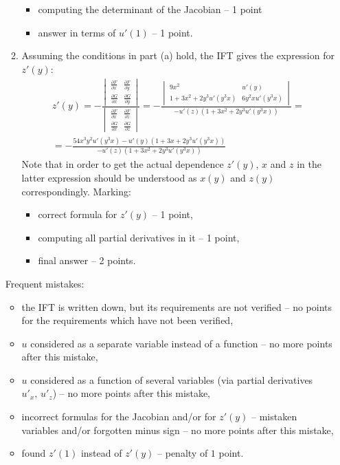 \begin{enumerate}
\begin{enumerate}
\begin{itemize}
        \item computing the determinant of the Jacobian -- 1 point
        \item answer in terms of $u'(1)$ -- 1 point.
        \end{itemize}
    \item Assuming the conditions in part (a) hold, the IFT gives the expression for $z'(y)$:
    \[\begin{split}
    z'(y)=-\frac{\begin{vmatrix}\frac{\partial F}{\partial x}& \frac{\partial F}{\partial y}\\
            \frac{\partial G}{\partial x}& \frac{\partial G}{\partial y}\end{vmatrix}}
            {\begin{vmatrix}\frac{\partial F}{\partial x}& \frac{\partial F}{\partial z}\\
            \frac{\partial G}{\partial x}& \frac{\partial G}{\partial z}\end{vmatrix}}=
            -\frac{\begin{vmatrix}9x^2&u'(y)\\1+3x^2+2y^3u'(y^3x)&6y^2xu'(y^3x)\end{vmatrix}}{-u'(z)(1+3x^2+2y^3u'(y^3x))}=\\=-\frac{54x^3y^2u'(y^3x)-u'(y)(1+3x+2y^3u'(y^3x))}{-u'(z)(1+3x^2+2y^3u'(y^3x))}
    \end{split}
    \]
    Note that in order to get the actual dependence $z'(y)$, $x$ and $z$ in the latter expression should be understood as $x(y)$ and $z(y)$ correspondingly.
    Marking:
    \begin{itemize}
        \item correct formula for $z'(y)$ -- 1 point,
        \item computing all partial derivatives in it -- 1 point,
        \item final answer -- 2 points.
    \end{itemize}
\end{enumerate}

    Frequent mistakes:
    \begin{itemize}
    \item the IFT is written down, but its requirements are not verified -- no points for the requirements which have not been verified,
    \item $u$ considered as a separate variable instead of a function -- no more points after this mistake,
    \item $u$ considered as a function of several variables (via partial derivatives $u'_x,\,u'_z$) -- no more points after this mistake,
    \item incorrect formulas for the Jacobian and/or for $z'(y)$ -- mistaken variables and/or forgotten minus sign -- no more points after this mistake,
    \item found $z'(1)$ instead of $z'(y)$ -- penalty of $1$ point.
    \end{itemize}


\end{enumerate}
